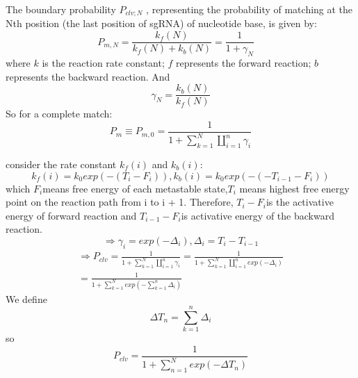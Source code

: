 The boundary probability $P_{clv;N}$ , representing the probability of matching at the Nth position (the last position of sgRNA) of nucleotide base, is given by:
\begin{equation}
P_{m,N}=\frac{k_f(N)}{k_f(N)+k_b(N)}=\frac{1}{1+\gamma_N} \quad
\end{equation}
where $k$ is the reaction rate constant; $f$ represents the forward reaction; $b$ represents the backward reaction. And 
\begin{equation}
 \gamma_N=\frac{k_b(N)}{k_f(N)}
\end{equation}
So for a complete match: 
\begin{equation}
P_{m} \equiv P_{m,0} = \frac{1}{1+\sum_{k=1}^N\coprod_{i=1}^n \gamma_i}
\end{equation}

consider the rate constant $k_f(i)$ and $k_b(i)$:
\begin{equation}
k_f(i)=k_0exp(-(T_i-F_i)),k_b(i)=k_0exp(-(-T_{i-1}-F_i))
\end{equation}
which $F_i$means free energy of each metastable state,$T_i$ means highest free energy point on the reaction path from i to i + 1. Therefore, $T_i-F_i$is the activative energy of forward reaction and $T_{i-1}-F_i$is activative energy of the backward reaction.
\begin{equation}
\Rightarrow \gamma_i=exp(-\Delta_i),\Delta_i=T_i-T_{i-1}
\end{equation}
\begin{equation}
\begin{aligned}
\Rightarrow P_{clv} = \frac{1}{1+\sum_{k=1}^N\coprod_{i=1}^n \gamma_i}=\frac{1}{1+\sum_{k=1}^N\coprod_{i=1}^n exp(-\Delta_i)}\\=\frac{1}{1+\sum_{k=1}^N exp(-\sum_{k=1}^n\Delta_i)}
\end{aligned}
\end{equation}
We define $$\Delta T_n=\sum_{k=1}^n\Delta_i$$
so
\begin{equation} 
P_{clv} =\frac{1}{1+\sum_{n=1}^N exp(-\Delta T_n)}
\end{equation}
	
